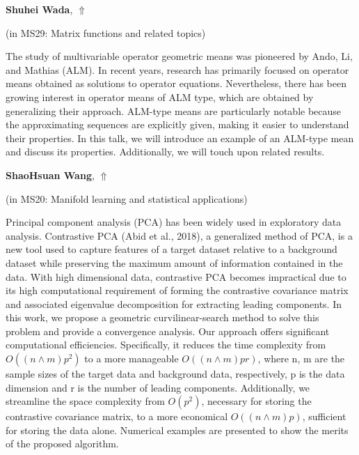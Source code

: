 \documentclass[ILAS2025-program.tex]{subfiles}
\begin{document}
\hypertarget{down0124}{}\begin{ilasabstract}
    
\textbf{Shuhei Wada},  \hfill \hyperlink{up0124}{$\Uparrow$}
    
    
(in {\color{mstitle}MS29: Matrix functions and related topics})
        
\mtskip
    The study of multivariable operator geometric means was pioneered by Ando, Li, and Mathias (ALM). In recent years, research has primarily focused on operator means obtained as solutions to operator equations. Nevertheless, there has been growing interest in operator means of ALM type, which are obtained by generalizing their approach. ALM-type means are particularly notable because the approximating sequences are explicitly given, making it easier to understand their properties. In this talk, we will introduce an example of an ALM-type mean and discuss its properties. Additionally, we will touch upon related results.

\end{ilasabstract}
    

\hypertarget{down0041}{}\begin{ilasabstract}
    
\textbf{ShaoHsuan Wang},  \hfill \hyperlink{up0041}{$\Uparrow$}
    
    
(in {\color{mstitle}MS20: Manifold learning and statistical applications})
        
\mtskip
    Principal component analysis (PCA) has been widely used in exploratory data analysis. 
Contrastive PCA (Abid et al., 2018), a generalized method of PCA, is a new tool used to 
capture features of a target dataset relative to a background dataset while preserving the 
maximum amount of information contained in the data. With high dimensional data, contrastive PCA becomes impractical due to its high computational requirement of forming the 
contrastive covariance matrix and associated eigenvalue decomposition for extracting leading 
components. In this work, we propose a geometric curvilinear-search method to solve this 
problem and provide a convergence analysis. Our approach offers significant computational 
efficiencies. Specifically, it reduces the time complexity from $O((n \wedge m)p^2 )$ to a more manageable $O((n \wedge m)pr)$, where n, m are the sample sizes of the target data and background
data, respectively, p is the data dimension and r is the number of leading components. Additionally, we streamline the space complexity from $O(p^2)$, necessary for storing the contrastive 
covariance matrix, to a more economical $O((n \wedge m)p)$, sufficient for storing the data alone.
Numerical  examples  are  presented  to  show  the  merits  of  the  proposed  algorithm.
\end{ilasabstract}
    
\end{document}
